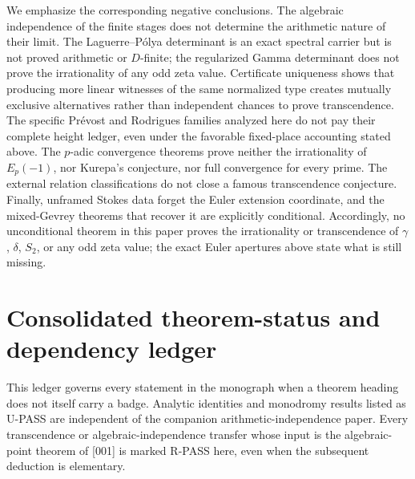 \documentclass[11pt]{article}
\theoremstyle{keio}
\theoremstyle{definition}
\theoremstyle{remark}
\newcommand{\UPASS}{\textcolor{keiogreen}{\textsf{U-PASS}}}
\newcommand{\RPASS}{\textcolor{keioxblue}{\textsf{R-PASS}}}
\begin{document}
We emphasize the corresponding negative conclusions.  The algebraic independence of the
finite stages does not determine the arithmetic nature of their limit.  The
Laguerre--P\'olya determinant is an exact spectral carrier but is not proved
arithmetic or \(D\)-finite; the regularized Gamma determinant does not prove
the irrationality of any odd zeta value.  Certificate uniqueness shows that producing more
linear witnesses of the same normalized type creates mutually exclusive
alternatives rather than independent chances to prove transcendence.  The
specific Pr\'evost and Rodrigues families analyzed here do not pay their
complete height ledger, even under the favorable fixed-place accounting
stated above.  The \(p\)-adic convergence theorems prove neither the
irrationality of \(E_p(-1)\), nor Kurepa's conjecture, nor full convergence
for every prime.  The external relation classifications do not close a
famous transcendence conjecture.  Finally, unframed Stokes data forget the
Euler extension coordinate, and the mixed-Gevrey theorems that recover it
are explicitly conditional.
Accordingly, no unconditional theorem in this paper proves the irrationality or
transcendence of \(\gamma\), \(\delta\), \(S_2\), or any odd zeta value; the
exact Euler apertures above state what is still missing.
\section{Consolidated theorem-status and dependency ledger}
\label{sec:master-status-ledger}

This ledger governs every statement in the monograph when a theorem heading
does not itself carry a badge.  Analytic identities and monodromy results
listed as \UPASS{} are independent of the companion arithmetic-independence
paper.  Every transcendence or algebraic-independence transfer whose input is
the algebraic-point theorem of [001] is marked \RPASS{} here, even when the
subsequent deduction is elementary.
\end{document}
